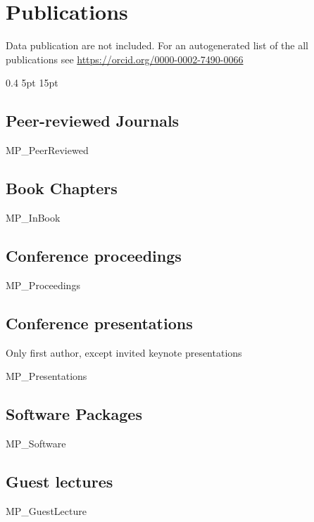 \documentclass[a4paper]{article}
\begin{document}
\section{Publications}

Data publication are not included. For an autogenerated list of the all publications see \url{https://orcid.org/0000-0002-7490-0066}

\titlespacing{\subsection}
            {0.4\textwidth}%
            {5pt}%
            {15pt}%
\subsection{Peer-reviewed Journals}

\begin{btSect}{MP_PeerReviewed}
\btPrintAll
\end{btSect}


\subsection{Book Chapters}

\begin{btSect}{MP_InBook}
\btPrintAll
\end{btSect}


\subsection{Conference proceedings}

\begin{btSect}{MP_Proceedings}
\btPrintAll
\end{btSect}


\subsection{Conference presentations}

Only first author, except invited keynote presentations
\begin{btSect}{MP_Presentations}
\btPrintAll
\end{btSect}

\subsection{Software Packages}

\begin{btSect}{MP_Software}
\btPrintAll
\end{btSect}


\subsection{Guest lectures}

\begin{btSect}{MP_GuestLecture}
\btPrintAll
\end{btSect}
\end{document}
